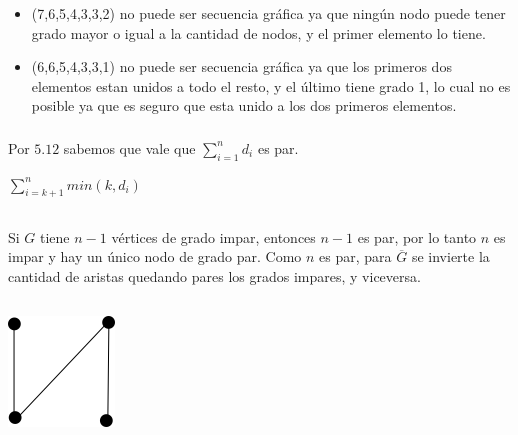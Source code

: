 \subsubsection{}
\begin{itemize}
\item (7,6,5,4,3,3,2) no puede ser secuencia gráfica ya que ningún nodo puede tener grado mayor o igual a la cantidad de nodos, y el primer elemento lo tiene.

\item (6,6,5,4,3,3,1) no puede ser secuencia gráfica ya que los primeros dos elementos estan unidos a todo el resto, y el último tiene grado 1, lo cual no es posible ya que es seguro que esta unido a los dos primeros elementos.
\end{itemize}

\subsubsection{}
Por $5.12$ sabemos que vale que $\sum_{i = 1}^{n}d_i$ es par.

$\sum_{i = k + 1}^{n}min(k, d_i)$

\subsection{}
Si $G$ tiene $n - 1$ vértices de grado impar, entonces $n - 1$ es par, por lo tanto $n$ es impar y hay un único nodo de grado par. Como $n$ es par, para $\overline{G}$ se invierte la cantidad de aristas quedando pares los grados impares, y viceversa.

\setcounter{subsection}{20}
\subsection{}
\subsubsection{}

\begin{center}
\includegraphics{imagenes/grafo_autocomplementario.png}
\end{center}

